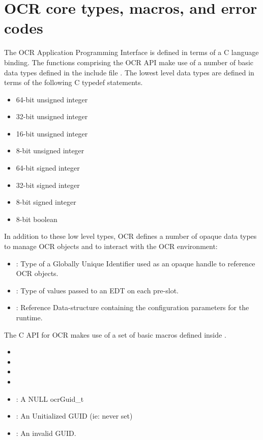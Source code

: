 %

\section{OCR core types, macros, and error codes}
\label{sec:OCRtypesmacros}

The OCR Application Programming Interface is defined in terms of a C language binding.
The functions comprising the OCR
API make use of a number of basic data types defined in the include file .
The lowest level data types are defined in terms of the following C typedef statements.
\begin{itemize}
\item {} 64-bit unsigned integer
\item {} 32-bit unsigned integer
\item {} 16-bit unsigned integer
\item {} 8-bit unsigned integer
\item {} 64-bit signed integer
\item {} 32-bit signed integer
\item {} 8-bit signed integer
\item {} 8-bit boolean
\end{itemize}

In addition to these low level types, OCR defines a number of opaque data types
to manage OCR objects and to interact with the OCR environment:
\begin{itemize}
\item {}: Type of a Globally Unique Identifier used as an opaque handle
to reference OCR objects.
\item {}:  Type of values passed to an EDT on each pre-slot.
%
\item {}:  Reference
Data-structure containing the configuration parameters for the runtime.
\end{itemize}

The C API for OCR makes use of a set of basic macros defined
 inside .
\begin{itemize}
\item {}
\item {}
\item {}
\item {}
\item {}: A NULL ocrGuid\_t
\item {}: An Unitialized GUID (ie: never set)
\item {}: An invalid GUID.
\end{itemize}

